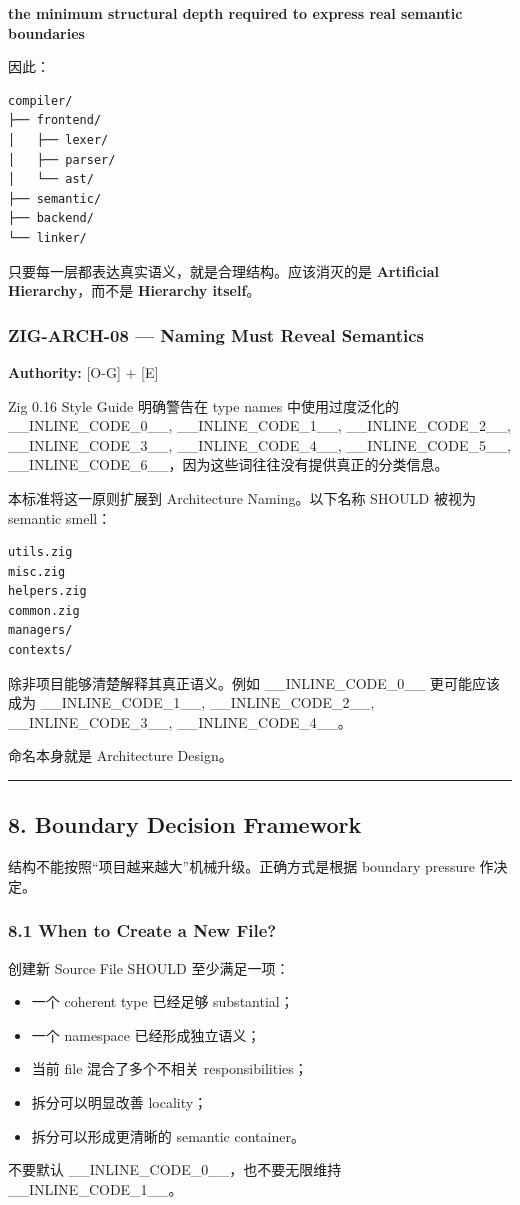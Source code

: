 \documentclass[11pt,a4paper]{article}
\begin{document}
\begin{gfmBlockquote}
\textbf{the minimum structural depth required to express real semantic boundaries}
\end{gfmBlockquote}
因此：

\begin{lstlisting}[language=text]
compiler/
├── frontend/
│   ├── lexer/
│   ├── parser/
│   └── ast/
├── semantic/
├── backend/
└── linker/
\end{lstlisting}
只要每一层都表达真实语义，就是合理结构。应该消灭的是 \textbf{Artificial Hierarchy}，而不是 \textbf{Hierarchy itself}。

\subsubsection{ZIG-ARCH-08 — Naming Must Reveal Semantics}
\textbf{Authority:} [O-G] + [E]

Zig 0.16 Style Guide 明确警告在 type names 中使用过度泛化的 \_\_INLINE\_CODE\_0\_\_, \_\_INLINE\_CODE\_1\_\_, \_\_INLINE\_CODE\_2\_\_, \_\_INLINE\_CODE\_3\_\_, \_\_INLINE\_CODE\_4\_\_, \_\_INLINE\_CODE\_5\_\_, \_\_INLINE\_CODE\_6\_\_，因为这些词往往没有提供真正的分类信息。

本标准将这一原则扩展到 Architecture Naming。以下名称 SHOULD 被视为 semantic smell：

\begin{lstlisting}[language=text]
utils.zig
misc.zig
helpers.zig
common.zig
managers/
contexts/
\end{lstlisting}
除非项目能够清楚解释其真正语义。例如 \_\_INLINE\_CODE\_0\_\_ 更可能应该成为 \_\_INLINE\_CODE\_1\_\_, \_\_INLINE\_CODE\_2\_\_, \_\_INLINE\_CODE\_3\_\_, \_\_INLINE\_CODE\_4\_\_。

命名本身就是 Architecture Design。

\vspace{0.5em}\hrule\vspace{0.5em}
\subsection{8. Boundary Decision Framework}
结构不能按照“项目越来越大”机械升级。正确方式是根据 boundary pressure 作决定。

\subsubsection{8.1 When to Create a New File?}
创建新 Source File SHOULD 至少满足一项：

\begin{itemize}
  \item 一个 coherent type 已经足够 substantial；
  \item 一个 namespace 已经形成独立语义；
  \item 当前 file 混合了多个不相关 responsibilities；
  \item 拆分可以明显改善 locality；
  \item 拆分可以形成更清晰的 semantic container。
\end{itemize}
不要默认 \_\_INLINE\_CODE\_0\_\_，也不要无限维持 \_\_INLINE\_CODE\_1\_\_。
\end{document}
